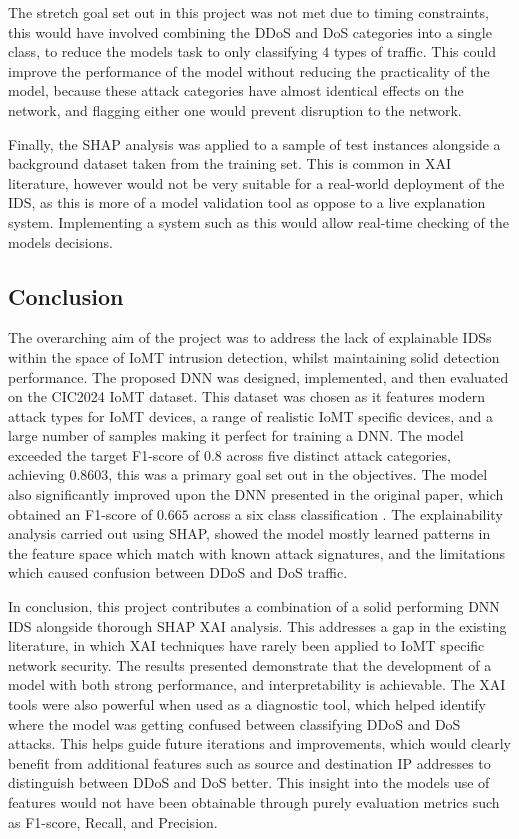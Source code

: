 \documentclass[11pt,a4paper]{article}
\begin{document}
The stretch goal set out in this project was not met due to timing constraints, this would have involved combining the DDoS and DoS categories into a single class, to reduce the models task to only classifying $4$ types of traffic. This could improve the performance of the model without reducing the practicality of the model, because these attack categories have almost identical effects on the network, and flagging either one would prevent disruption to the network.

Finally, the SHAP analysis was applied to a sample of test instances alongside a background dataset taken from the training set. This is common in XAI literature, however would not be very suitable for a real-world deployment of the IDS, as this is more of a model validation tool as oppose to a live explanation system. Implementing a system such as this would allow real-time checking of the models decisions.

\subsection{Conclusion}
The overarching aim of the project was to address the lack of explainable IDSs within the space of IoMT intrusion detection, whilst maintaining solid detection performance. The proposed DNN was designed, implemented, and then evaluated on the CIC2024 IoMT dataset. This dataset was chosen as it features modern attack types for IoMT devices, a range of realistic IoMT specific devices, and a large number of samples making it perfect for training a DNN. The model exceeded the target F1-score of $0.8$ across five distinct attack categories, achieving $0.8603$, this was a primary goal set out in the objectives. The model also significantly improved upon the DNN presented in the original paper, which obtained an F1-score of $0.665$ across a six class classification \cite{dadkhah2024ciciomt2024}. The explainability analysis carried out using SHAP, showed the model mostly learned patterns in the feature space which match with known attack signatures, and the limitations which caused confusion between DDoS and DoS traffic.

In conclusion, this project contributes a combination of a solid performing DNN IDS alongside thorough SHAP XAI analysis. This addresses a gap in the existing literature, in which XAI techniques have rarely been applied to IoMT specific network security. The results presented demonstrate that the development of a model with both strong performance, and interpretability is achievable. The XAI tools were also powerful when used as a diagnostic tool, which helped identify where the model was getting confused between classifying DDoS and DoS attacks. This helps guide future iterations and improvements, which would clearly benefit from additional features such as source and destination IP addresses to distinguish between DDoS and DoS better. This insight into the models use of features would not have been obtainable through purely evaluation metrics such as F1-score, Recall, and Precision.
\end{document}
